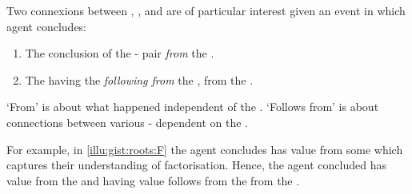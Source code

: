 \begin{note}
  Two connexions between , , and  are of particular interest given an event in which agent concludes:
  \begin{enumerate}
  \item
    The \agents{} conclusion of the - pair \emph{from} the .
  \item
    The  having the  \emph{following from} the , from the \agpe{}.
  \end{enumerate}
  `From' is about what happened independent of the \agpe{}.
  `Follows from' is about connections between various - dependent on the \agpe{}.

  For example, in \autoref{illu:gist:roots:F} the agent concludes \propM{\rootsCon{}} has value  from some \pool{} which captures their understanding of factorisation.
  Hence, the agent concluded \propM{\rootsCon{}} has value  from the \pool{} and \propM{\rootsCon{}} having value  follows from the \pool{} from the \agpe{}.
\end{note}


